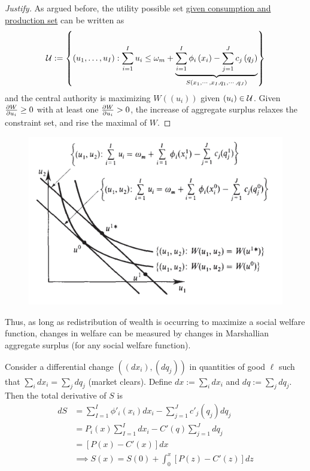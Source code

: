 \documentclass{report}
\begin{document}
		\begin{proof}[Justify]
			As argued before, the utility possible set \ul{given consumption and production set} can be written as 
			\begin{equation}
				\mathcal{{U}} := \left\{\left(u_{1}, \ldots, u_{I}\right) : \sum_{i=1}^{I} u_{i} \leq \omega_{m}+
				\underbrace{\sum_{i=1}^{I} \phi_{i}\left(x_{i}\right)-\sum_{j=1}^{J} c_{j}\left(q_{j}\right)}_{S(x_1, \cdots, x_I, q_1, \cdots, q_J)}
				\right\}
			\end{equation}
			and the central authority is maximizing $W((u_i))$ given $(u_i) \in \mathcal{{U}}$. Given $\frac{\partial{W}}{\partial{u_i}} \geq 0$ with at least one $\frac{\partial{W}}{\partial{u_i}} > 0$, the increase of aggregate surplus relaxes the constraint set, and rise the maximal of $W$.
		\end{proof}
		
		\begin{figure}[h]
			\centering
			\includegraphics[width=0.5\linewidth]{figures/welfare1}
		\end{figure}
		
		\begin{remark}
			Thus, as long as redistribution of wealth is occurring to maximize a social welfare function, changes in welfare can be measured by changes in Marshallian aggregate surplus (for any social welfare function).
		\end{remark}
		
		\begin{proposition}
			Consider a differential change $((dx_i), (dq_j))$ in quantities of good $\ell$ such that $\sum_i dx_i = \sum_j dq_j$ (market clears). Define $dx := \sum_i dx_i$ and $dq := \sum_j dq_j$. Then the total derivative of $S$ is 
			\begin{align}
				dS &= \sum_{I=1}^I \phi'_i(x_i) dx_i - \sum_{j=1}^J c'_j(q_j) dq_j \\
				&= P_i(x) \sum_{I=1}^I dx_i - C'(q) \sum_{j=1}^J dq_j \\
				&= [P(x) - C'(x)] dx \\
				&\implies S(x) = S(0) + \int_0^x [P(z) - C'(z)]dz
			\end{align}
		\end{proposition}
		
\end{document}
